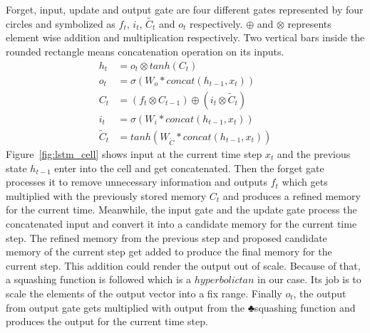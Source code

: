 \documentclass[10pt,twocolumn,letterpaper]{article}
\begin{document}
Forget, input, update and output gate are four different gates represented by four circles and symbolized as $f_t$, $i_t$, $\tilde{C_t}$ and $o_t$ respectively. $\oplus$ and $\otimes$ represents element wise addition and multiplication respectively. Two vertical bars inside the rounded rectangle means concatenation operation on its inputs. 
\begin{equation}
\label{eq:lstm_eq}
	\begin{aligned}
		h_t &= o_t \otimes tanh(C_t) \\
		o_t &= \sigma(W_o * concat(h_{t-1}, x_t)) \\
		C_t &= (f_t \otimes C_{t-1}) \oplus (i_t \otimes \tilde{C}_t)  \\
		i_t &= \sigma(W_i * concat(h_{t-1}, x_t)) \\
		\tilde{C}_t &= tanh(W_{\tilde{C}} * concat(h_{t-1}, x_t))
	\end{aligned}
\end{equation}
Figure~\ref{fig:lstm_cell} shows input at the current time step $x_t$ and the previous state $h_{t-1}$ enter into the cell and get concatenated. Then the forget gate processes it to remove unnecessary information and outputs $f_t$ which gets multiplied with the previously stored memory $C_t$ and produces a refined memory for the current time. Meanwhile, the input gate and the update gate process the concatenated input and convert it into a candidate memory for the current time step. The refined memory from the previous step and proposed candidate memory of the current step get added to produce the final memory for the current step. This addition could render the output out of scale. Because of that, a squashing function is followed which is a $hyperbolic tan$ in our case. Its job is to scale the elements of the output vector into a fix range. Finally $o_t$, the output from output gate gets multiplied with output from the ♣squashing function and produces the output for the current time step. 
\end{document}
